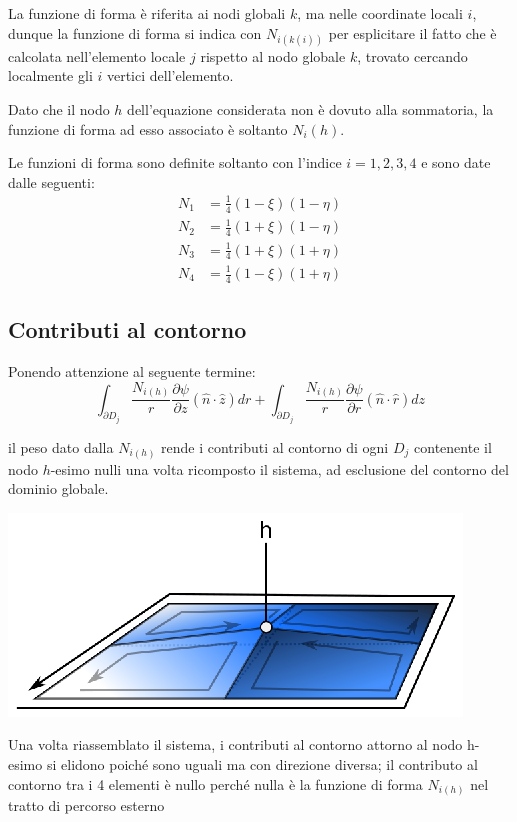 \documentclass{tufte-handout}
\newcommand{\de}[2]{\dfrac{\partial #1}{\partial #2}}
\begin{document}
La funzione di forma è riferita ai nodi globali $k$, ma nelle coordinate locali $i$, dunque la funzione di forma si indica con $N_{i(k(i))}$ per esplicitare il fatto che è calcolata nell'elemento locale $j$ rispetto al nodo globale $k$, trovato cercando localmente gli $i$ vertici dell'elemento.

Dato che il nodo $h$ dell'equazione considerata non è dovuto alla sommatoria, la funzione di forma ad esso associato è soltanto $N_i(h)$.

Le funzioni di forma sono definite soltanto con l'indice $i = {1,2,3,4}$ e sono date dalle seguenti:
\begin{align*}
    N_1 &= \frac{1}{4}(1-\xi)(1-\eta)\\
    N_2 &= \frac{1}{4}(1+\xi)(1-\eta)\\
    N_3 &= \frac{1}{4}(1+\xi)(1+\eta)\\
    N_4 &= \frac{1}{4}(1-\xi)(1+\eta)
\end{align*}

\subsection{Contributi al contorno}
Ponendo attenzione al seguente termine:
\begin{equation*}
    \int_{\partial D_j}\frac{N_{i(h)}}{r}\de{\psi}{z} (\hat{n}\cdot \hat{z})dr
    +
    \int_{\partial D_j}\frac{N_{i(h)}}{r}\de{\psi}{r} (\hat{n}\cdot \hat{r})dz
\end{equation*}

il peso dato dalla $N_{i(h)}$ rende i contributi al contorno di ogni $D_j$ contenente il nodo $h$-esimo nulli una volta ricomposto il sistema, ad esclusione del contorno del dominio globale.

\begin{marginfigure}%
  \includegraphics[width=\linewidth]{fem/contcontorno.eps}
  \caption{Una volta riassemblato il sistema, i contributi al contorno attorno al nodo h-esimo si elidono poiché sono uguali ma con direzione diversa; il contributo al contorno tra i 4 elementi è nullo perché nulla è la funzione di forma $N_{i(h)}$ nel tratto di percorso esterno}
  \label{fig:contcontorno}
\end{marginfigure}
\end{document}
